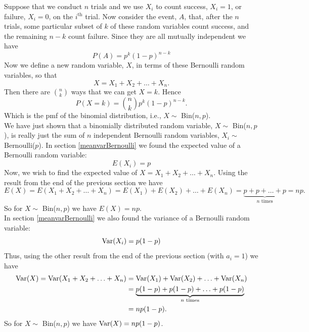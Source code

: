 \noindent Suppose that we conduct $n$ trials and we use $X_i$ to count success, $X_i = 1$, or failure, $X_i = 0$, on the $i^\text{th}$ trial. Now consider the event, $A$, that, after the $n$ trials, some particular subset of $k$ of these random variables count success, and the remaining $n-k$ count failure. Since they are all mutually independent we have
\[
P(A) = p^k(1-p)^{n-k}
\]
Now we define a new random variable, $X$, in terms of these Bernoulli random variables, so that
\[
X = X_1 + X_2 + \ldots + X_n.
\]
Then there are $\binom{n}{k}$ ways that we can get $X = k$. Hence
\[
P(X = k) = \binom{n}{k}p^k(1-p)^{n-k}.
\]
Which is the pmf of the binomial distribution, i.e., $X \sim$ Bin($n,p$). \\

\noindent We have just shown that a binomially distributed random variable, $X \sim$ Bin($n,p$), is really just the sum of $n$ independent Bernoulli random variables, $X_i \sim$ Bernoulli($p$). In section \ref{meanvarBernoulli} we found the expected value of a Bernoulli random variable:
\[
E(X_i) = p
\]
Now, we wish to find the expected value of $X = X_1 + X_2 + \ldots + X_n$. Using the result from the end of the previous section we have
\[
E(X) = E(X_1 + X_2 + \ldots + X_n) = E(X_1) + E(X_2) + \ldots + E(X_n) = \underbrace{p + p + \ldots + p}_{\text{$n$ times}} = np.
\]
\noindent So for $X \sim$ Bin($n,p$) we have $E(X) = np$.  \\

\noindent In section \ref{meanvarBernoulli} we also found the variance of a Bernoulli random variable:
\[
\text{Var}(X_i) = p(1-p)
\]
Thus, using the other result from the end of the previous section (with $a_i = 1$) we have
\begin{align*}
\text{Var}(X) = \text{Var}(X_1 + X_2 + \ldots + X_n)  & = \text{Var}(X_1) + \text{Var}(X_2) + \ldots + \text{Var}(X_n) \\
	& = \underbrace{p(1-p) + p(1-p) + \ldots + p(1-p)}_{\text{$n$ times}} \\
	& = np(1-p).
\end{align*}
\noindent So for $X \sim$ Bin($n,p$) we have $\text{Var}(X) = np(1-p)$.
















